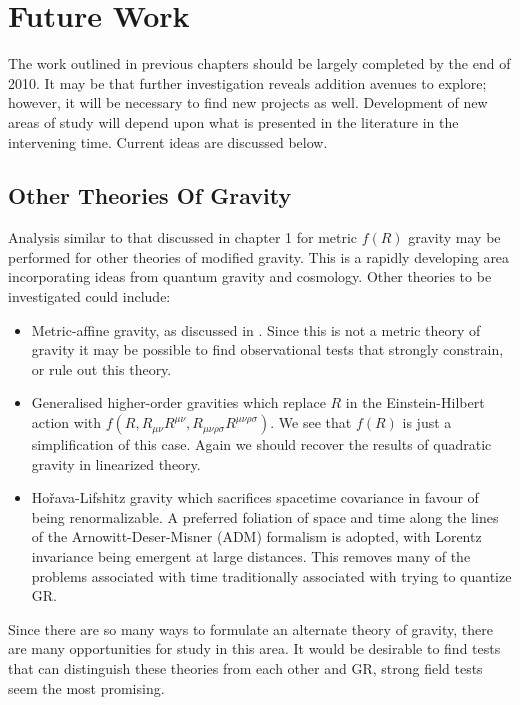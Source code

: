 \chapter{Future Work}

The work outlined in previous chapters should be largely completed by the end of 2010. It may be that further investigation reveals addition avenues to explore; however, it will be necessary to find new projects as well. Development of new areas of study will depend upon what is presented in the literature in the intervening time. Current ideas are discussed below.

\section{Other Theories Of Gravity}

Analysis similar to that discussed in chapter 1 for metric $f(R)$ gravity may be performed for other theories of modified gravity. This is a rapidly developing area incorporating ideas from quantum gravity and cosmology. Other theories to be investigated could include:
\begin{itemize}
\item Metric-affine gravity\cite{Sotiriou2007, Sotiriou2007b}, as discussed in . Since this is not a metric theory of gravity it may be possible to find observational tests that strongly constrain, or rule out this theory\cite{Will2006}.
\item{} Generalised higher-order gravities which replace $R$ in the Einstein-Hilbert action with $f(R, R_{\mu\nu}R^{\mu\nu}, R_{\mu\nu\rho\sigma}R^{\mu\nu\rho\sigma})$\cite{Farhoudi2006, Madsen1989}. We see that $f(R)$ is just a simplification of this case. Again we should recover the results of quadratic gravity in linearized theory\cite{Pechlaner1966, Stelle1978, Schmidt1986, Teyssandier1990, Capozziello2009b}.
\item{} Ho\v{r}ava-Lifshitz gravity\cite{Horava2009, Blas2010a, Sotiriou2009c} which sacrifices spacetime covariance in favour of being renormalizable. A preferred foliation of space and time along the lines of the Arnowitt-Deser-Misner (ADM) formalism is adopted\cite{Arnowitt1962a}, with Lorentz invariance being emergent at large distances. This removes many of the problems associated with time traditionally associated with trying to quantize GR.
\end{itemize}
Since there are so many ways to formulate an alternate theory of gravity, there are many opportunities for study in this area. It would be desirable to find tests that can distinguish these theories from each other and GR, strong field tests seem the most promising.

